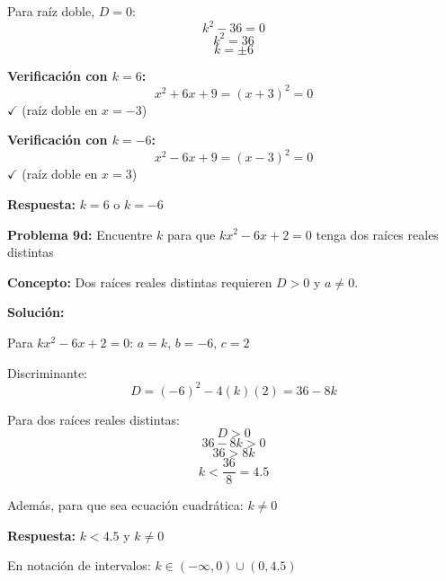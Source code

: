 Para raíz doble, $D = 0$:
$$k^2 - 36 = 0$$
$$k^2 = 36$$
$$k = \pm 6$$

\textbf{Verificación con $k = 6$:}
$$x^2 + 6x + 9 = (x+3)^2 = 0$$ $\checkmark$ (raíz doble en $x = -3$)

\textbf{Verificación con $k = -6$:}
$$x^2 - 6x + 9 = (x-3)^2 = 0$$ $\checkmark$ (raíz doble en $x = 3$)

\textbf{Respuesta:} $k = 6$ o $k = -6$

\textbf{Problema 9d:} Encuentre $k$ para que $kx^2 - 6x + 2 = 0$ tenga dos raíces reales distintas

\textbf{Concepto:} Dos raíces reales distintas requieren $D > 0$ y $a \neq 0$.

\textbf{Solución:}

Para $kx^2 - 6x + 2 = 0$: $a = k$, $b = -6$, $c = 2$

Discriminante:
$$D = (-6)^2 - 4(k)(2) = 36 - 8k$$

Para dos raíces reales distintas:
$$D > 0$$
$$36 - 8k > 0$$
$$36 > 8k$$
$$k < \frac{36}{8} = 4.5$$

Además, para que sea ecuación cuadrática: $k \neq 0$

\textbf{Respuesta:} $k < 4.5$ y $k \neq 0$

En notación de intervalos: $k \in (-\infty, 0) \cup (0, 4.5)$
